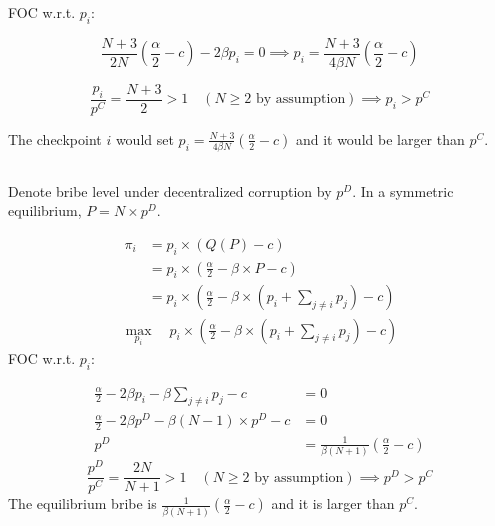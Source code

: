 \documentclass[a4paper]{article}
\begin{document}
FOC w.r.t. $p_i$:

\begin{equation*}
    \frac{N+3}{2N}\left(\frac{\alpha}{2}-c\right)-2\beta p_i=0\implies 
    p_i=\frac{N+3}{4\beta N}\left(\frac{\alpha}{2}-c\right)
\end{equation*}

\begin{equation*}
    \frac{p_i}{p^C}=\frac{N+3}{2}>1\quad (N\geq 2\text{ by assumption})\implies p_i>p^C
\end{equation*}

The checkpoint $i$ would set $p_i=\frac{N+3}{4\beta N}\left(\frac{\alpha}{2}-c\right)$ and it would be larger than $p^C$.

\subsection{}

Denote bribe level under decentralized corruption by $p^D$. In a symmetric equilibrium, $P=N\times p^D$.

\begin{align*}
    \pi_i&=p_i\times (Q(P)-c) \\
    &=p_i\times\left(\frac{\alpha}{2}-\beta\times P-c \right) \\
    &=p_i\times\left(\frac{\alpha}{2}-\beta\times\left(p_i + \sum_{j\neq i}p_j\right)-c \right)
\end{align*}
\begin{align*}
    \max_{p_i}\quad p_i\times\left(\frac{\alpha}{2}-\beta\times\left(p_i + \sum_{j\neq i}p_j\right)-c \right)
\end{align*}
FOC w.r.t. $p_i$:

\begin{align*}
    \frac{\alpha}{2}-2\beta p_i-\beta\sum_{j\neq i}p_j -c&=0 \\
    \frac{\alpha}{2}-2\beta p^D-\beta(N-1)\times p^D -c&=0 \\
    p^D&=\frac{1}{\beta(N+1)}\left(\frac{\alpha}{2}-c \right)
\end{align*}
\begin{equation*}
    \frac{p^D}{p^C}=\frac{2N}{N+1}>1\quad (N\geq 2\text{ by assumption})\implies p^D>p^C
\end{equation*}
The equilibrium bribe is $\frac{1}{\beta(N+1)}\left(\frac{\alpha}{2}-c \right)$ and it is larger than $p^C$.

\subsection{}
\end{document}

